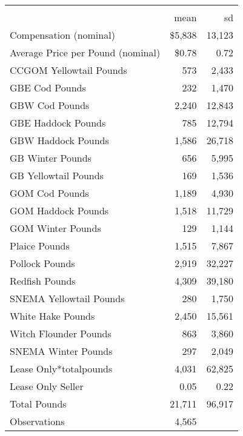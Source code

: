{
\def\sym#1{\ifmmode^{#1}\else\(^{#1}\)\fi}
\begin{tabular}{l*{1}{rr}}
\hline\hline
                    &\multicolumn{2}{c}{}     \\
                    &        mean&          sd\\
\hline
Compensation (nominal)&       \$5,838&      13,123\\
Average Price per Pound (nominal)&           \$0.78&           0.72\\
CCGOM Yellowtail Pounds&         573&       2,433\\
GBE Cod Pounds      &         232&       1,470\\
GBW Cod Pounds      &       2,240&      12,843\\
GBE Haddock Pounds  &         785&      12,794\\
GBW Haddock Pounds  &       1,586&      26,718\\
GB Winter Pounds    &         656&       5,995\\
GB Yellowtail Pounds&         169&       1,536\\
GOM Cod Pounds      &       1,189&       4,930\\
GOM Haddock Pounds  &       1,518&      11,729\\
GOM Winter Pounds   &         129&       1,144\\
Plaice Pounds       &       1,515&       7,867\\
Pollock Pounds      &       2,919&      32,227\\
Redfish Pounds      &       4,309&      39,180\\
SNEMA Yellowtail Pounds&         280&       1,750\\
White Hake Pounds   &       2,450&      15,561\\
Witch Flounder Pounds&         863&       3,860\\
SNEMA Winter Pounds &         297&       2,049\\
Lease Only*totalpounds&       4,031&      62,825\\
Lease Only Seller   &           0.05&           0.22\\
Total Pounds        &      21,711&      96,917\\
\hline
Observations        &        4,565&            \\
\hline\hline
\end{tabular}
}
